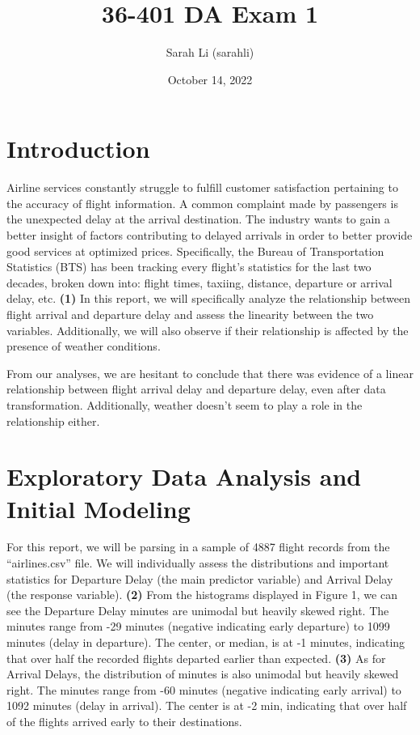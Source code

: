 \documentclass[
  12pt,
]{article}
\title{36-401 DA Exam 1}
\author{Sarah Li (sarahli)}
\date{October 14, 2022}
\begin{document}
\maketitle

\hypertarget{introduction}{%
\section{Introduction}\label{introduction}}

Airline services constantly struggle to fulfill customer satisfaction
pertaining to the accuracy of flight information. A common complaint
made by passengers is the unexpected delay at the arrival destination.
The industry wants to gain a better insight of factors contributing to
delayed arrivals in order to better provide good services at optimized
prices. Specifically, the Bureau of Transportation Statistics (BTS) has
been tracking every flight's statistics for the last two decades, broken
down into: flight times, taxiing, distance, departure or arrival delay,
etc. \textbf{(1)} In this report, we will specifically analyze the
relationship between flight arrival and departure delay and assess the
linearity between the two variables. Additionally, we will also observe
if their relationship is affected by the presence of weather conditions.

From our analyses, we are hesitant to conclude that there was evidence
of a linear relationship between flight arrival delay and departure
delay, even after data transformation. Additionally, weather doesn't
seem to play a role in the relationship either.

\hypertarget{exploratory-data-analysis-and-initial-modeling}{%
\section{Exploratory Data Analysis and Initial
Modeling}\label{exploratory-data-analysis-and-initial-modeling}}

For this report, we will be parsing in a sample of 4887 flight records
from the ``airlines.csv'' file. We will individually assess the
distributions and important statistics for Departure Delay (the main
predictor variable) and Arrival Delay (the response variable).
\textbf{(2)} From the histograms displayed in Figure 1, we can see the
Departure Delay minutes are unimodal but heavily skewed right. The
minutes range from -29 minutes (negative indicating early departure) to
1099 minutes (delay in departure). The center, or median, is at -1
minutes, indicating that over half the recorded flights departed earlier
than expected. \textbf{(3)} As for Arrival Delays, the distribution of
minutes is also unimodal but heavily skewed right. The minutes range
from -60 minutes (negative indicating early arrival) to 1092 minutes
(delay in arrival). The center is at -2 min, indicating that over half
of the flights arrived early to their destinations.
\end{document}
